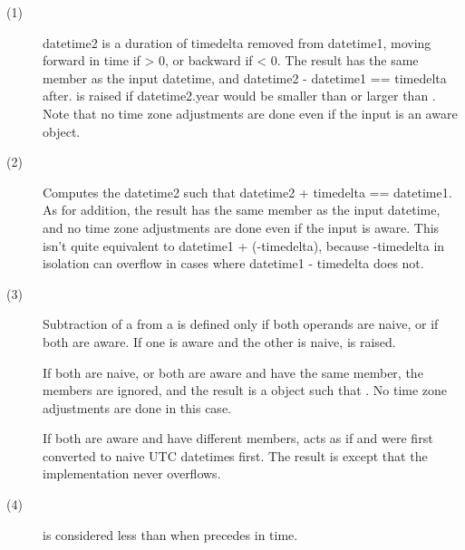 \begin{description}

\item[(1)]

    datetime2 is a duration of timedelta removed from datetime1, moving
    forward in time if  > 0, or backward if
     < 0.  The result has the same  member
    as the input datetime, and datetime2 - datetime1 == timedelta after.
     is raised if datetime2.year would be
    smaller than  or larger than .
    Note that no time zone adjustments are done even if the input is an
    aware object.

\item[(2)]
    Computes the datetime2 such that datetime2 + timedelta == datetime1.
    As for addition, the result has the same  member
    as the input datetime, and no time zone adjustments are done even
    if the input is aware.
    This isn't quite equivalent to datetime1 + (-timedelta), because
    -timedelta in isolation can overflow in cases where
    datetime1 - timedelta does not.

\item[(3)]
    Subtraction of a  from a
     is defined only if both
    operands are naive, or if both are aware.  If one is aware and the
    other is naive,  is raised.

    If both are naive, or both are aware and have the same 
    member, the  members are ignored, and the result is
    a  object  such that
    .  No time zone
    adjustments are done in this case.

    If both are aware and have different  members,
     acts as if  and  were first converted to
    naive UTC datetimes first.  The result is
    except that the implementation never overflows.

\item[(4)]

 is considered less than 
when  precedes  in time.  


\end{description}
